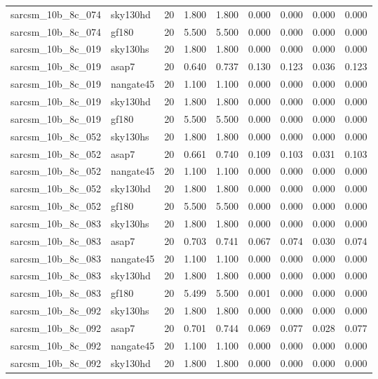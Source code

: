 \begin{tabular}{llrrrrrrr}
sarcsm\_10b\_8c\_074 & sky130hd & 20 & 1.800 & 1.800 & 0.000 & 0.000 & 0.000 & 0.000 \\
sarcsm\_10b\_8c\_074 & gf180 & 20 & 5.500 & 5.500 & 0.000 & 0.000 & 0.000 & 0.000 \\
sarcsm\_10b\_8c\_019 & sky130hs & 20 & 1.800 & 1.800 & 0.000 & 0.000 & 0.000 & 0.000 \\
sarcsm\_10b\_8c\_019 & asap7 & 20 & 0.640 & 0.737 & 0.130 & 0.123 & 0.036 & 0.123 \\
sarcsm\_10b\_8c\_019 & nangate45 & 20 & 1.100 & 1.100 & 0.000 & 0.000 & 0.000 & 0.000 \\
sarcsm\_10b\_8c\_019 & sky130hd & 20 & 1.800 & 1.800 & 0.000 & 0.000 & 0.000 & 0.000 \\
sarcsm\_10b\_8c\_019 & gf180 & 20 & 5.500 & 5.500 & 0.000 & 0.000 & 0.000 & 0.000 \\
sarcsm\_10b\_8c\_052 & sky130hs & 20 & 1.800 & 1.800 & 0.000 & 0.000 & 0.000 & 0.000 \\
sarcsm\_10b\_8c\_052 & asap7 & 20 & 0.661 & 0.740 & 0.109 & 0.103 & 0.031 & 0.103 \\
sarcsm\_10b\_8c\_052 & nangate45 & 20 & 1.100 & 1.100 & 0.000 & 0.000 & 0.000 & 0.000 \\
sarcsm\_10b\_8c\_052 & sky130hd & 20 & 1.800 & 1.800 & 0.000 & 0.000 & 0.000 & 0.000 \\
sarcsm\_10b\_8c\_052 & gf180 & 20 & 5.500 & 5.500 & 0.000 & 0.000 & 0.000 & 0.000 \\
sarcsm\_10b\_8c\_083 & sky130hs & 20 & 1.800 & 1.800 & 0.000 & 0.000 & 0.000 & 0.000 \\
sarcsm\_10b\_8c\_083 & asap7 & 20 & 0.703 & 0.741 & 0.067 & 0.074 & 0.030 & 0.074 \\
sarcsm\_10b\_8c\_083 & nangate45 & 20 & 1.100 & 1.100 & 0.000 & 0.000 & 0.000 & 0.000 \\
sarcsm\_10b\_8c\_083 & sky130hd & 20 & 1.800 & 1.800 & 0.000 & 0.000 & 0.000 & 0.000 \\
sarcsm\_10b\_8c\_083 & gf180 & 20 & 5.499 & 5.500 & 0.001 & 0.000 & 0.000 & 0.000 \\
sarcsm\_10b\_8c\_092 & sky130hs & 20 & 1.800 & 1.800 & 0.000 & 0.000 & 0.000 & 0.000 \\
sarcsm\_10b\_8c\_092 & asap7 & 20 & 0.701 & 0.744 & 0.069 & 0.077 & 0.028 & 0.077 \\
sarcsm\_10b\_8c\_092 & nangate45 & 20 & 1.100 & 1.100 & 0.000 & 0.000 & 0.000 & 0.000 \\
sarcsm\_10b\_8c\_092 & sky130hd & 20 & 1.800 & 1.800 & 0.000 & 0.000 & 0.000 & 0.000 \\

\end{tabular}
